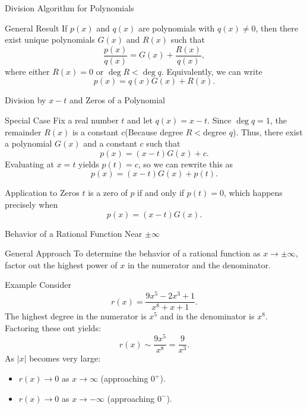 \begin{frame}{Division Algorithm for Polynomials}
  \begin{block}{General Result}
    If \(p(x)\) and \(q(x)\) are polynomials with \(q(x) \neq 0\), then there exist unique polynomials \(G(x)\) and \(R(x)\) such that
    \[
      \frac{p(x)}{q(x)} = G(x) + \frac{R(x)}{q(x)},
    \]
    where either \(R(x)=0\) or \(\deg R < \deg q\). Equivalently, we can write
    \[
      p(x)=q(x)G(x)+R(x).
    \]
  \end{block}
\end{frame}


\begin{frame}{Division by \(x-t\) and Zeros of a Polynomial}
  \begin{block}{Special Case}
    Fix a real number \(t\) and let \(q(x)=x-t\). Since \(\deg q=1\), the remainder \(R(x)\) is a constant \(c\)(Because degree \(R < \)degree \(q\)). Thus, there exist a polynomial \(G(x)\) and a constant \(c\) such that
    \[
      p(x) = (x-t)G(x) + c.
    \]
    Evaluating at \(x=t\) yields \(p(t)=c\), so we can rewrite this as
    \[
      p(x) = (x-t)G(x) + p(t).
    \]
  \end{block}
  \vspace{0.5em}
  \begin{block}{Application to Zeros}
    \(t\) is a zero of \(p\) if and only if \(p(t)=0\), which happens precisely when
    \[
      p(x)=(x-t)G(x).
    \]
  \end{block}
\end{frame}

\begin{frame}{Behavior of a Rational Function Near \(\pm\infty\)}
  \begin{block}{General Approach}
    To determine the behavior of a rational function as \(x\to\pm\infty\), factor out the highest power of \(x\) in the numerator and the denominator.
  \end{block}
\end{frame} 
\begin{frame}
  \begin{block}{Example}
    Consider 
    \[
      r(x)=\frac{9x^5-2x^3+1}{x^8+x+1}.
    \]
    The highest degree in the numerator is \(x^5\) and in the denominator is \(x^8\). Factoring these out yields:
    \[
      r(x) \sim \frac{9x^5}{x^8}=\frac{9}{x^3}.
    \]
    As \(|x|\) becomes very large:
    \begin{itemize}
      \item \(r(x)\to 0\) as \(x\to\infty\) (approaching \(0^+\)).
      \item \(r(x)\to 0\) as \(x\to-\infty\) (approaching \(0^-\)).
    \end{itemize}
  \end{block}
\end{frame}

